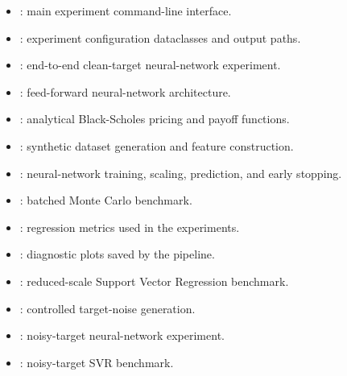 \begin{itemize}
    \item \href{https://github.com/matteogiorgi/nn-option-pricing/blob/main/scripts/run_experiment.py}{}: main experiment command-line interface.
    \item \href{https://github.com/matteogiorgi/nn-option-pricing/blob/main/src/nn_option_pricing/config.py}{}: experiment configuration dataclasses and output paths.
    \item \href{https://github.com/matteogiorgi/nn-option-pricing/blob/main/src/nn_option_pricing/pipeline.py}{}: end-to-end clean-target neural-network experiment.
    \item \href{https://github.com/matteogiorgi/nn-option-pricing/blob/main/src/nn_option_pricing/model.py}{}: feed-forward neural-network architecture.
    \item \href{https://github.com/matteogiorgi/nn-option-pricing/blob/main/src/nn_option_pricing/black_scholes.py}{}: analytical Black-Scholes pricing and payoff functions.
    \item \href{https://github.com/matteogiorgi/nn-option-pricing/blob/main/src/nn_option_pricing/dataset.py}{}: synthetic dataset generation and feature construction.
    \item \href{https://github.com/matteogiorgi/nn-option-pricing/blob/main/src/nn_option_pricing/training.py}{}: neural-network training, scaling, prediction, and early stopping.
    \item \href{https://github.com/matteogiorgi/nn-option-pricing/blob/main/src/nn_option_pricing/monte_carlo.py}{}: batched Monte Carlo benchmark.
    \item \href{https://github.com/matteogiorgi/nn-option-pricing/blob/main/src/nn_option_pricing/evaluation.py}{}: regression metrics used in the experiments.
    \item \href{https://github.com/matteogiorgi/nn-option-pricing/blob/main/src/nn_option_pricing/plots.py}{}: diagnostic plots saved by the pipeline.
    \item \href{https://github.com/matteogiorgi/nn-option-pricing/blob/main/src/nn_option_pricing/svr.py}{}: reduced-scale Support Vector Regression benchmark.
    \item \href{https://github.com/matteogiorgi/nn-option-pricing/blob/main/src/nn_option_pricing/noise.py}{}: controlled target-noise generation.
    \item \href{https://github.com/matteogiorgi/nn-option-pricing/blob/main/src/nn_option_pricing/noisy_experiment.py}{}: noisy-target neural-network experiment.
    \item \href{https://github.com/matteogiorgi/nn-option-pricing/blob/main/src/nn_option_pricing/noisy_svr_experiment.py}{}: noisy-target SVR benchmark.
\end{itemize}

